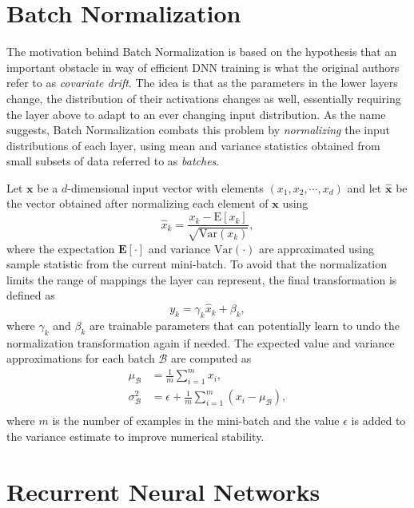 \documentclass{article}
\begin{document}
\section{Batch Normalization}

The motivation behind Batch Normalization is based on the hypothesis that an
important obstacle in way of efficient DNN training is what the original
authors refer to as \emph{covariate drift}. The idea is that as the parameters
in the lower layers change, the distribution of their activations changes as
well, essentially requiring the layer above to adapt to an ever changing input
distribution. As the name suggests, Batch Normalization combats this problem by
\emph{normalizing} the input distributions of each layer, using mean and
variance statistics obtained from small subsets of data referred to as
\emph{batches}.

Let $\mathbf{x}$ be a $d$-dimensional input vector with elements $(x_1, x_2, \cdots, x_d)$ and let $\mathbf{\hat{x}}$ be the vector obtained after normalizing each element of $\mathbf{x}$ using
\begin{equation}
\hat{x}_k = \frac{x_k - \mathrm{E}[x_k]}{\sqrt{\text{Var}(x_k)}},
\end{equation}
where the expectation $\mathbf{E}[\cdot]$ and variance $\text{Var}(\cdot)$ are
approximated using sample statistic from the current mini-batch.
To avoid that the normalization limits the range of mappings the layer can represent, the final transformation is defined as
\begin{equation}
y_k = \gamma_k \hat{x}_k + \beta_k,
\end{equation}
where $\gamma_k$ and $\beta_k$ are trainable parameters that can potentially
learn to undo the normalization transformation again if needed.
The expected value and variance approximations for each batch $\mathcal{B}$ are computed as
\begin{align}
\mu_{\mathcal{B}} &= \frac{1}{m}\sum_{i=1}^{m} x_i,\\
\sigma^2_{\mathcal{B}} &= \epsilon + \frac{1}{m}\sum_{i=1}^{m} (x_i - \mu_{\mathcal{B}}),\\
\end{align}
where $m$ is the number of examples in the mini-batch and the value $\epsilon$
is added to the variance estimate to improve numerical stability.

\section{Recurrent Neural Networks}
\end{document}

